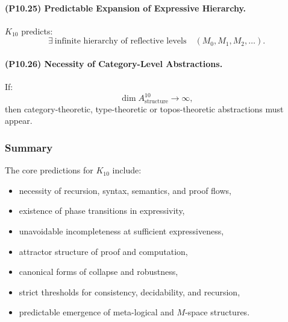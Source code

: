 \paragraph{(P10.25) Predictable Expansion of Expressive Hierarchy.}
$K_{10}$ predicts:
\[
\exists \ \text{infinite hierarchy of reflective levels}
\quad (M_0, M_1, M_2, \ldots).
\]

\paragraph{(P10.26) Necessity of Category-Level Abstractions.}
If:
\[
\dim A_{\mathrm{structure}}^{10} \to \infty,
\]
then category-theoretic, type-theoretic or topos-theoretic 
abstractions must appear.

\subsubsection{Summary}

The core predictions for $K_{10}$ include:
\begin{itemize}
    \item necessity of recursion, syntax, semantics, and proof flows,
    \item existence of phase transitions in expressivity,
    \item unavoidable incompleteness at sufficient expressiveness,
    \item attractor structure of proof and computation,
    \item canonical forms of collapse and robustness,
    \item strict thresholds for consistency, decidability, and recursion,
    \item predictable emergence of meta-logical and $M$-space structures.
\end{itemize}
